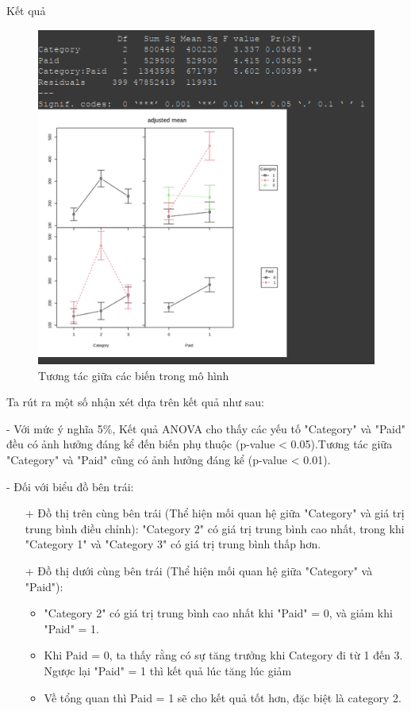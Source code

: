 \begin{itemize}
\begin{itemize}
    Kết quả
    \begin{figure}[H]
        \centering
        \includegraphics[width=0.8\linewidth]{part23_figures/08.png}
        \caption{Tương tác giữa các biến trong mô hình}
        \label{fig:Tương tác giữa các biến trong mô hình}
    \end{figure}
Ta rút ra một số nhận xét dựa trên kết quả như sau: 

- Với mức ý nghĩa 5\%,  Kết quả ANOVA cho thấy các yếu tố "Category" và "Paid" đều có ảnh hưởng đáng kể đến biến phụ thuộc (p-value < 0.05).Tương tác giữa "Category" và "Paid" cũng có ảnh hưởng đáng kể (p-value < 0.01).

- Đối với biểu đồ bên trái:
    \begin{itemize}
        \item [+]  Đồ thị trên cùng bên trái (Thể hiện mối quan hệ giữa "Category" và giá trị trung bình điều chỉnh): "Category 2" có giá trị trung bình cao nhất, trong khi "Category 1" và "Category 3" có giá trị trung bình thấp hơn.
        \item [+]  Đồ thị dưới cùng bên trái (Thể hiện mối quan hệ giữa "Category" và "Paid"):
        \begin{itemize}
            \item "Category 2" có giá trị trung bình cao nhất khi "Paid" = 0, và giảm khi "Paid" = 1.
            \item Khi Paid = 0, ta thấy rằng có sự tăng trưởng khi Category đi từ 1 đến 3. Ngược lại "Paid" = 1 thì kết quả lúc tăng lúc giảm
            \item Về tổng quan thì Paid = 1 sẽ cho kết quả tốt hơn, đặc biệt là category 2.
        \end{itemize}
    \end{itemize}


\end{itemize}
\end{itemize}
